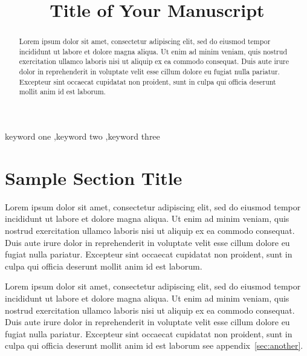 \documentclass[preprint,12pt]{elsarticle}
\begin{document}
\begin{frontmatter}

\title{Title of Your Manuscript}


\begin{abstract}
Lorem ipsum dolor sit amet, consectetur adipiscing elit, sed do eiusmod tempor incididunt ut labore et dolore magna aliqua. Ut enim ad minim veniam, quis nostrud exercitation ullamco laboris nisi ut aliquip ex ea commodo consequat. Duis aute irure dolor in reprehenderit in voluptate velit esse cillum dolore eu fugiat nulla pariatur. Excepteur sint occaecat cupidatat non proident, sunt in culpa qui officia deserunt mollit anim id est laborum.
\end{abstract}

\begin{keyword}
keyword one \sep keyword two \sep keyword three
\end{keyword}

\end{frontmatter}

\linenumbers

\section{Sample Section Title}
\label{sec:sample1}


Lorem ipsum dolor sit amet, consectetur adipiscing \citep{Fabioetal2013} elit, sed do eiusmod tempor incididunt ut labore et dolore magna \citet{Blondeletal2008} aliqua. Ut enim ad minim veniam, quis nostrud exercitation ullamco laboris nisi ut aliquip ex ea commodo consequat. Duis aute irure dolor in reprehenderit in voluptate velit esse cillum dolore eu fugiat nulla pariatur. Excepteur sint occaecat cupidatat non proident, sunt in culpa qui officia deserunt mollit \citet{Blondeletal2008,FabricioLiang2013} anim id est laborum.

Lorem ipsum dolor sit amet, consectetur adipiscing elit, sed do eiusmod tempor incididunt ut labore et dolore magna aliqua. Ut enim ad minim veniam, quis nostrud exercitation ullamco laboris nisi ut aliquip ex ea commodo consequat. Duis aute irure dolor in reprehenderit in voluptate velit esse cillum dolore eu fugiat nulla pariatur. Excepteur sint occaecat cupidatat non proident, sunt in culpa qui officia deserunt mollit anim id est laborum see appendix~\ref{sec:another}.
\end{document}
